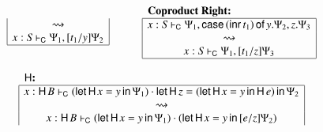 \documentclass{lmcs}
\newcommand{\DualLNLLogicnt}[1]{\mathit{#1}}
\newcommand{\DualLNLLogicmv}[1]{\mathit{#1}}
\newcommand{\DualLNLLogicsym}[1]{#1}
\begin{document}
\begin{figure}
\begin{mdframed}
\begin{center}
\begin{math}
\begin{array}{c}
\begin{array}{lll}
\begin{array}{|c|}
              \rightsquigarrow\\
                   \DualLNLLogicmv{x}  :  \DualLNLLogicnt{S}  \vdash_{\mathsf{C} }  \Psi_{{\mathrm{1}}}  \DualLNLLogicsym{,}  \DualLNLLogicsym{[}  \DualLNLLogicnt{t_{{\mathrm{1}}}}  \DualLNLLogicsym{/}  \DualLNLLogicmv{y}  \DualLNLLogicsym{]}  \Psi_{{\mathrm{2}}} \\
                  \hline
        \end{array}
        & \quad &
        \begin{array}{|c|}
          \multicolumn{1}{l}{\textbf{Coproduct Right:}}\\
          \hline
               \DualLNLLogicmv{x}  :  \DualLNLLogicnt{S}  \vdash_{\mathsf{C} }  \Psi_{{\mathrm{1}}}  \DualLNLLogicsym{,}   \mathsf{case}\, \DualLNLLogicsym{(}   \mathsf{inr}\, \DualLNLLogicnt{t_{{\mathrm{1}}}}   \DualLNLLogicsym{)} \,\mathsf{of}\, \DualLNLLogicmv{y} . \Psi_{{\mathrm{2}}} ,  \DualLNLLogicmv{z} . \Psi_{{\mathrm{3}}}  \\
              \rightsquigarrow\\
                   \DualLNLLogicmv{x}  :  \DualLNLLogicnt{S}  \vdash_{\mathsf{C} }  \Psi_{{\mathrm{1}}}  \DualLNLLogicsym{,}  \DualLNLLogicsym{[}  \DualLNLLogicnt{t_{{\mathrm{1}}}}  \DualLNLLogicsym{/}  \DualLNLLogicmv{z}  \DualLNLLogicsym{]}  \Psi_{{\mathrm{3}}} \\
                  \hline
        \end{array}
      \end{array}\\
      \\
      \begin{array}{|c|}
        \multicolumn{1}{l}{\textbf{$\mathsf{H}$:}}\\
        \hline        
         \DualLNLLogicmv{x}  :   \mathsf{H}\, \DualLNLLogicnt{B}   \vdash_{\mathsf{C} }  \DualLNLLogicsym{(}   \mathsf{let}\,\mathsf{H}\, \DualLNLLogicmv{x}  =  \DualLNLLogicmv{y} \,\mathsf{in}\, \Psi_{{\mathrm{1}}}   \DualLNLLogicsym{)}  \cdot   \mathsf{let}\,\mathsf{H}\, \DualLNLLogicmv{z}  =  \DualLNLLogicsym{(}   \mathsf{let}\,\mathsf{H}\, \DualLNLLogicmv{x}  =  \DualLNLLogicmv{y} \,\mathsf{in}\,  \mathsf{H}\, \DualLNLLogicnt{e}    \DualLNLLogicsym{)} \,\mathsf{in}\, \Psi_{{\mathrm{2}}}  \\
        \rightsquigarrow\\
         \DualLNLLogicmv{x}  :   \mathsf{H}\, \DualLNLLogicnt{B}   \vdash_{\mathsf{C} }  \DualLNLLogicsym{(}   \mathsf{let}\,\mathsf{H}\, \DualLNLLogicmv{x}  =  \DualLNLLogicmv{y} \,\mathsf{in}\, \Psi_{{\mathrm{1}}}   \DualLNLLogicsym{)}  \cdot  \DualLNLLogicsym{(}   \mathsf{let}\,\mathsf{H}\, \DualLNLLogicmv{x}  =  \DualLNLLogicmv{y} \,\mathsf{in}\, \DualLNLLogicsym{[}  \DualLNLLogicnt{e}  \DualLNLLogicsym{/}  \DualLNLLogicmv{z}  \DualLNLLogicsym{]}  \Psi_{{\mathrm{2}}}   \DualLNLLogicsym{)} \\

\end{array}
\end{array}
\end{math}
\end{center}
\end{mdframed}
\end{figure}
\end{document}
